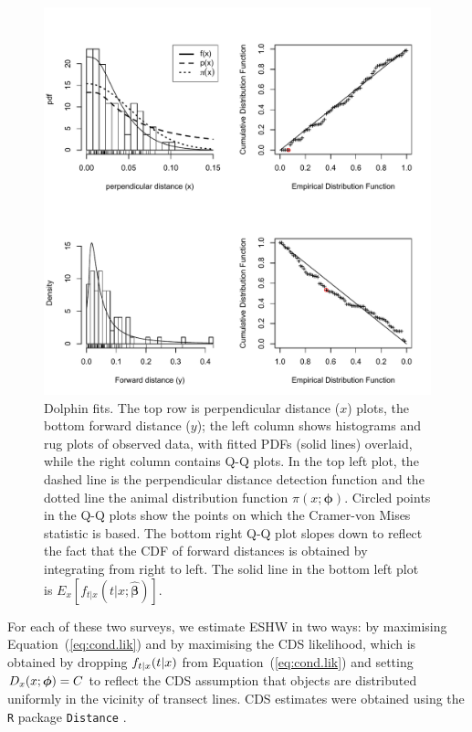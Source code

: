 \documentclass[useAMS,usenatbib,referee]{biom}
\begin{document}
\begin{figure}
\caption{Dolphin fits.  The top row is perpendicular distance ($x$) plots, the bottom forward distance ($y$); the left column shows histograms and rug plots of observed data, with fitted PDFs (solid lines) overlaid, while the right column contains Q-Q plots. In the top left plot, the dashed line is the perpendicular distance detection function and the dotted line the animal distribution function $\pi(x;\boldsymbol{\phi})$. Circled points in the Q-Q plots show the points on which the Cramer-von Mises statistic is based. The bottom right Q-Q plot slopes down to reflect the fact that the CDF of forward distances is obtained by integrating from right to left. The solid line in the bottom left plot is $E_x[f_{t|x}(t|x;\hat{\boldsymbol{\beta}})]$.\label{fig:dolphin.fits}}
\includegraphics[scale=0.6]{DolphinFits.pdf}
\end{figure}

For each of these two surveys, we estimate ESHW in two ways: by maximising Equation~(\ref{eq:cond.lik}) and by maximising the CDS likelihood, which is obtained by dropping $f_{t|x}(\boldmath{t}|\boldmath{x})$ from Equation~(\ref{eq:cond.lik}) and setting $D_x(x;{\mbox{\boldmath $\phi$}})=C$ to reflect the CDS assumption that objects are distributed uniformly in the vicinity of transect lines. CDS estimates were obtained using the \texttt{R} package  \texttt{Distance} \citep{Miller:15}.
\end{document}

